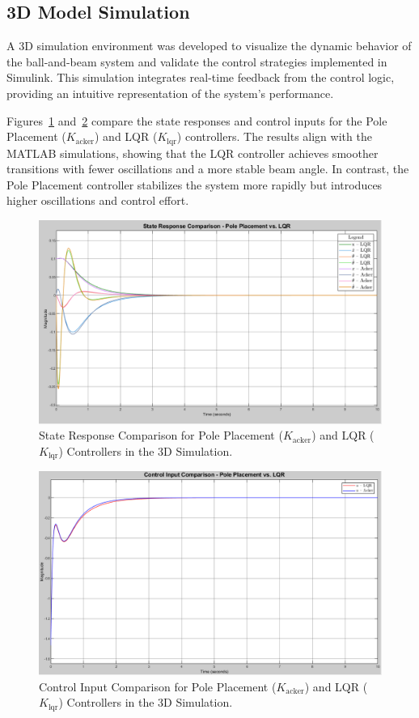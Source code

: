 \documentclass[conference]{IEEEtran}
\begin{document}
\subsection{3D Model Simulation}
\label{subsec:3d_simulation}

A 3D simulation environment was developed to visualize the dynamic behavior of the ball-and-beam system and validate the control strategies implemented in Simulink. This simulation integrates real-time feedback from the control logic, providing an intuitive representation of the system's performance.

Figures~\ref{fig:state_compare} and~\ref{fig:control_input_compare} compare the state responses and control inputs for the Pole Placement (\(K_{\text{acker}}\)) and LQR (\(K_{\text{lqr}}\)) controllers. The results align with the MATLAB simulations, showing that the LQR controller achieves smoother transitions with fewer oscillations and a more stable beam angle. In contrast, the Pole Placement controller stabilizes the system more rapidly but introduces higher oscillations and control effort.

\begin{figure}[H]
    \centering
    \includegraphics[width=0.8\linewidth]{figures/states_compare_scope.png}
    \caption{State Response Comparison for Pole Placement (\(K_{\text{acker}}\)) and LQR (\(K_{\text{lqr}}\)) Controllers in the 3D Simulation.}
    \label{fig:state_compare}
\end{figure}

\begin{figure}[H]
    \centering
    \includegraphics[width=0.8\linewidth]{figures/control_input_compare.png}
    \caption{Control Input Comparison for Pole Placement (\(K_{\text{acker}}\)) and LQR (\(K_{\text{lqr}}\)) Controllers in the 3D Simulation.}
    \label{fig:control_input_compare}
\end{figure}
\end{document}
